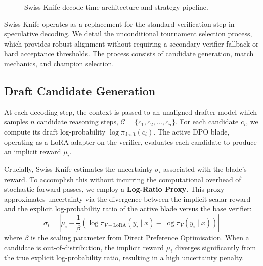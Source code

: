 \documentclass[letterpaper]{article} %
\begin{document}
\begin{figure}[t]
{%
}
\caption{Swiss Knife decode-time architecture and strategy pipeline.}
\label{fig:swiss_knife}
\end{figure}

Swiss Knife operates as a replacement for the standard verification step in speculative decoding. We detail the unconditional tournament selection process, which provides robust alignment without requiring a secondary verifier fallback or hard acceptance thresholds. The process consists of candidate generation, match mechanics, and champion selection.


\subsection{Draft Candidate Generation}
At each decoding step, the context is passed to an unaligned drafter model which samples $n$ candidate reasoning steps, $\mathcal{C} = \{c_1, c_2, \dots, c_n\}$. For each candidate $c_i$, we compute its draft log-probability $\log \pi_{\text{draft}}(c_i)$. The active DPO blade, operating as a LoRA adapter on the verifier, evaluates each candidate to produce an implicit reward $\mu_i$. 

Crucially, Swiss Knife estimates the uncertainty $\sigma_i$ associated with the blade's reward. To accomplish this without incurring the computational overhead of stochastic forward passes, we employ a \textbf{Log-Ratio Proxy}. This proxy approximates uncertainty via the divergence between the implicit scalar reward and the explicit log-probability ratio of the active blade versus the base verifier:
\[
\sigma_i = \left| \mu_i - \frac{1}{\beta} \left( \log \pi_{V+\text{LoRA}}(y_i \mid x) - \log \pi_V(y_i \mid x) \right) \right|
\]
where $\beta$ is the scaling parameter from Direct Preference Optimisation. When a candidate is out-of-distribution, the implicit reward $\mu_i$ diverges significantly from the true explicit log-probability ratio, resulting in a high uncertainty penalty.
\end{document}
